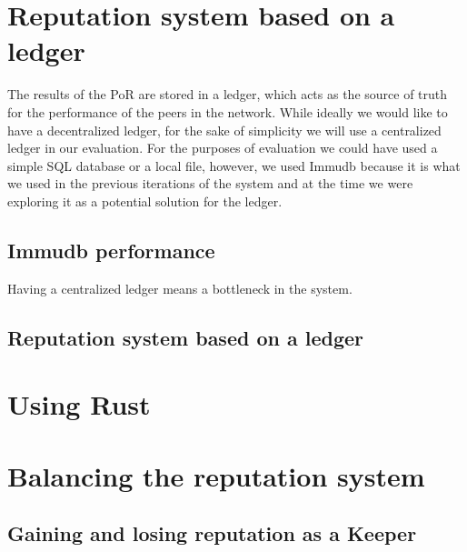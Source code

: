 \section{Reputation system based on a ledger}

The results of the PoR are stored in a ledger, which acts as the source of truth for
the performance of the peers in the network.
While ideally we would like to have a decentralized ledger, for the sake of simplicity
we will use a centralized ledger in our evaluation.
For the purposes of evaluation we could have used a simple SQL database or a local file,
however, we used Immudb because it is what we used in the previous iterations of the system
and at the time we were exploring it as a potential solution for the ledger.

\subsection{Immudb performance}

Having a centralized ledger means a bottleneck in the system.


\subsection{Reputation system based on a ledger}

\section{Using Rust}



\section{Balancing the reputation system}

\subsection{Gaining and losing reputation as a Keeper}


